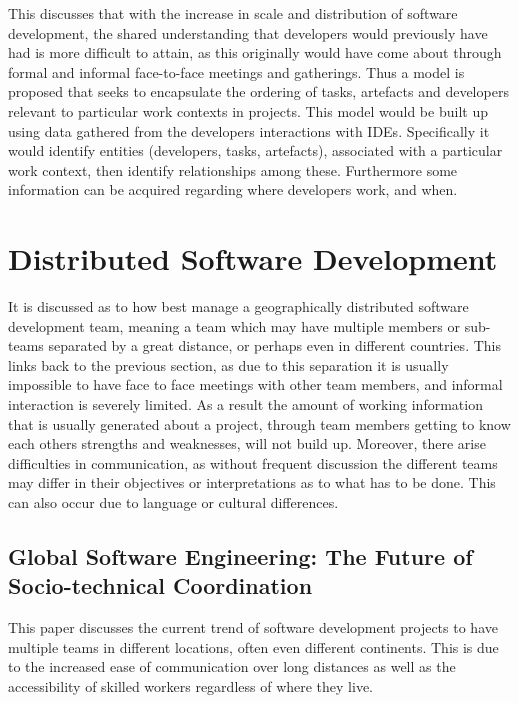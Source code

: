 \documentclass{l4proj}
\begin{document}
This discusses that with the increase in scale and distribution of software development, the shared understanding that developers would previously have had is more difficult to attain, as this originally would have come about through formal and informal face-to-face meetings and gatherings.  Thus a model is proposed that seeks to encapsulate the ordering of tasks, artefacts and developers relevant to particular work contexts in projects.  This model would be built up using data gathered from the developers interactions with IDEs.  Specifically it would identify entities (developers, tasks, artefacts), associated with a particular work context, then identify relationships among these. Furthermore some information can be acquired regarding where developers work, and when.


\section {Distributed Software Development}

It is discussed as to how best manage a geographically distributed software development team, meaning a team which may have multiple members or sub-teams separated by a great distance, or perhaps even in different countries.  This links back to the previous section, as due to this separation it is usually impossible to have face to face meetings with other team members, and informal interaction is severely limited.   As a result the amount of working information that is usually generated about a project, through team members getting to know each others strengths and weaknesses, will not build up.  Moreover, there arise difficulties in communication, as without frequent discussion the different teams may differ in their objectives or interpretations as to what has to be done.  This can also occur due to language or cultural differences.

\subsection{Global Software Engineering: The Future of Socio-technical Coordination}

This paper discusses the current trend of software development projects to have multiple teams in different locations, often even different continents.  This is due to the increased ease of communication over long distances as well as the accessibility of skilled workers regardless of where they live.
\end{document}
